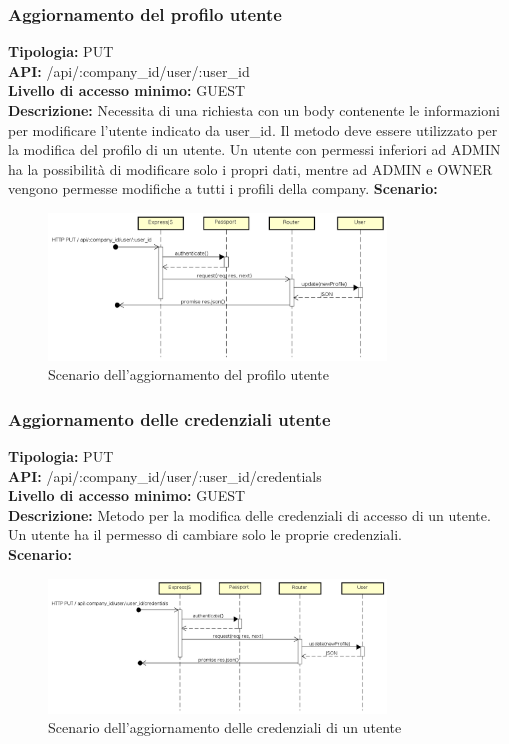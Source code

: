 \newpage
\subsubsection{Aggiornamento del profilo utente}
\textbf{Tipologia:} PUT \\
\textbf{API:} /api/:company\_id/user/:user\_id \\
\textbf{Livello di accesso minimo:} GUEST \\
\textbf{Descrizione:} Necessita di una richiesta con un body contenente le informazioni per modificare l'utente indicato da user\_id. Il metodo deve essere utilizzato per la modifica del profilo di un utente. Un utente con permessi inferiori ad ADMIN ha la possibilità di modificare solo i propri dati, mentre ad ADMIN e OWNER vengono permesse modifiche a tutti i profili della company. 
\textbf{Scenario:} 
\begin{figure}[h]
\centering
\includegraphics[width=0.8\textwidth]{res/sections/backend/(PUT)profiloUtente.png}
\caption{Scenario dell'aggiornamento del profilo utente}
\end{figure}

\newpage
\subsubsection{Aggiornamento delle credenziali utente}
\textbf{Tipologia:} PUT \\
\textbf{API:} /api/:company\_id/user/:user\_id/credentials \\
\textbf{Livello di accesso minimo:} GUEST \\
\textbf{Descrizione:} Metodo per la modifica delle credenziali di accesso di un utente. Un utente ha il permesso di cambiare solo le proprie credenziali. \\
\textbf{Scenario:} 
\begin{figure}[h]
\centering
\includegraphics[width=0.8\textwidth]{res/sections/backend/(PUT)credenzialiUtente.png}
\caption{Scenario dell'aggiornamento delle credenziali di un utente}
\end{figure}

